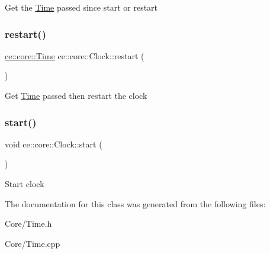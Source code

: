 Get the \hyperlink{structce_1_1core_1_1_time}{Time} passed since start or restart \mbox{\label{classce_1_1core_1_1_clock_ad2f5f8ff6d8881ccd8626249232be0f2}} 
\subsubsection{\texorpdfstring{restart()}{restart()}}
{\footnotesize\ttfamily \hyperlink{structce_1_1core_1_1_time}{ce\+::core\+::\+Time} ce\+::core\+::\+Clock\+::restart (\begin{DoxyParamCaption}{ }\end{DoxyParamCaption})}

Get \hyperlink{structce_1_1core_1_1_time}{Time} passed then restart the clock \mbox{\label{classce_1_1core_1_1_clock_ae8ba6571cfacee77bf76e795969f772a}} 
\subsubsection{\texorpdfstring{start()}{start()}}
{\footnotesize\ttfamily void ce\+::core\+::\+Clock\+::start (\begin{DoxyParamCaption}{ }\end{DoxyParamCaption})}

Start clock 

The documentation for this class was generated from the following files\+:\begin{DoxyCompactItemize}
\item 
Core/Time.\+h\item 
Core/Time.\+cpp\end{DoxyCompactItemize}
